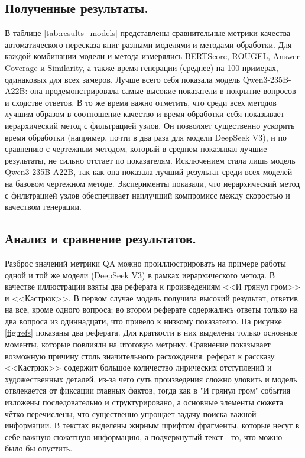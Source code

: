 \documentclass{superfri}
\begin{document}
\subsection{Полученные результаты.}
В таблице \ref{tab:results_models} представлены сравнительные метрики качества автоматического пересказа книг разными моделями и методами обработки. Для каждой комбинации модели и метода измерялись BERTScore, ROUGEL, Answer Coverage и 
Similarity, а также время генерации (среднее) на 100 примерах, одинаковых для всех замеров. Лучше всего себя показала модель Qwen3-\allowbreak 235B-\allowbreak A22B: она продемонстрировала самые высокие показатели в покрытие вопросов и сходстве ответов.
В то же время важно отметить, что среди всех методов лучшим образом в соотношение качество и время обработки себя показывает иерархический метод с фильтрацией узлов. Он позволяет существенно ускорить время обработки (например, почти в два раза для модели DeepSeek V3), и по сравнению с 
чертежным методом, который в среднем показывал лучшие результаты, не сильно отстает по показателям. Исключением стала лишь модель Qwen3-\allowbreak 235B-\allowbreak A22B, так как она показала лучший результат среди всех моделей на базовом чертежном методе.
Эксперименты показали, что иерархический метод с фильтрацией узлов обеспечивает наилучший компромисс между скоростью и качеством генерации.

\subsection{Анализ и сравнение результатов.}
Разброс значений метрики QA можно проиллюстрировать на примере работы одной и той же модели (DeepSeek V3) в рамках иерархического метода.
В качестве иллюстрации взяты два реферата к произведениям <<И грянул гром>> и <<Кастрюк>>. 
В первом случае модель получила высокий результат, ответив на все, кроме одного вопроса; во втором
реферате содержались ответы только на два вопроса из одиннадцати, что привело к низкому показателю. На рисунке \ref{fig:refs} показаны два реферата. 
Для краткости в них выделены только основные моменты, которые
повлияли на итоговую метрику. 
Сравнение показывает возможную причину столь значительного расхождения: реферат к рассказу <<Кастрюк>> содержит большое количество лирических отступлений и художественных деталей,
из-за чего суть произведения сложно уловить и модель отвлекается от фиксации главных фактов,
тогда как в "И грянул гром" события изложены последовательно и структурировано, 
а основные элементы сюжета чётко перечислены, что существенно упрощает задачу поиска важной информации.
В текстах выделены жирным шрифтом фрагменты, которые несут в себе важную сюжетную информацию, а подчеркнутый текст - то, что можно было бы опустить.
\end{document}
